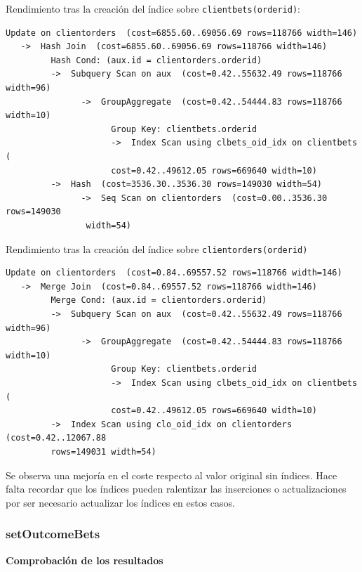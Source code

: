 \documentclass{article}
\begin{document}
Rendimiento tras la creación del índice sobre \texttt{clientbets(orderid)}:
\begin{lstlisting}[style=sql]
 Update on clientorders  (cost=6855.60..69056.69 rows=118766 width=146)
   ->  Hash Join  (cost=6855.60..69056.69 rows=118766 width=146)
         Hash Cond: (aux.id = clientorders.orderid)
         ->  Subquery Scan on aux  (cost=0.42..55632.49 rows=118766 width=96)
               ->  GroupAggregate  (cost=0.42..54444.83 rows=118766 width=10)
                     Group Key: clientbets.orderid
                     ->  Index Scan using clbets_oid_idx on clientbets  (
                     cost=0.42..49612.05 rows=669640 width=10)
         ->  Hash  (cost=3536.30..3536.30 rows=149030 width=54)
               ->  Seq Scan on clientorders  (cost=0.00..3536.30 rows=149030
                width=54)
\end{lstlisting}

Rendimiento tras la creación del índice sobre \texttt{clientorders(orderid)}
\begin{lstlisting}[style=sql]
 Update on clientorders  (cost=0.84..69557.52 rows=118766 width=146)
   ->  Merge Join  (cost=0.84..69557.52 rows=118766 width=146)
         Merge Cond: (aux.id = clientorders.orderid)
         ->  Subquery Scan on aux  (cost=0.42..55632.49 rows=118766 width=96)
               ->  GroupAggregate  (cost=0.42..54444.83 rows=118766 width=10)
                     Group Key: clientbets.orderid
                     ->  Index Scan using clbets_oid_idx on clientbets  (
                     cost=0.42..49612.05 rows=669640 width=10)
         ->  Index Scan using clo_oid_idx on clientorders  (cost=0.42..12067.88
         rows=149031 width=54)

\end{lstlisting}

Se observa una mejoría en el coste respecto al valor original sin índices. Hace falta recordar que los índices pueden ralentizar las inserciones o actualizaciones por ser necesario actualizar los índices en estos casos.
\newpage

\subsubsection{setOutcomeBets}

\textbf{Comprobación de los resultados}
\end{document}
